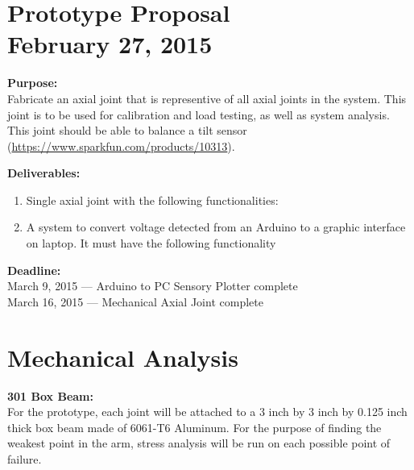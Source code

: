 \documentclass[11pt]{article}
\begin{document}
\section{Prototype Proposal \\ February 27, 2015}
\noindent \textbf{Purpose:}\\
\indent Fabricate an axial joint that is representive of all axial joints in the system. This joint is to be used for calibration and load testing, as well as system analysis.\\
\indent This joint should be able to balance a tilt sensor (\url{https://www.sparkfun.com/products/10313}).

\noindent \textbf{Deliverables:}
\begin{enumerate}
	\item Single axial joint with the following functionalities:
	\item A system to convert voltage detected from an Arduino to a graphic interface on laptop. It must have the following functionality
\end{enumerate}

\noindent \textbf{Deadline:}\\
March 9, 2015 --- Arduino to PC Sensory Plotter complete\\
March 16, 2015 --- Mechanical Axial Joint complete\\

\section{Mechanical Analysis}
\noindent \textbf{301 Box Beam:}\\
\indent For the prototype, each joint will be attached to a 3 inch by 3 inch by 0.125 inch thick box beam made of 6061-T6 Aluminum. For the purpose of finding the weakest point in the arm, stress analysis will be run on each possible point of failure.
\end{document}
